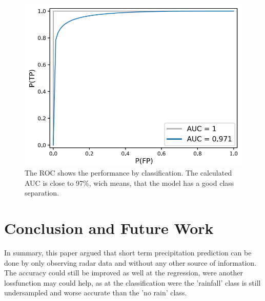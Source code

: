 \documentclass[oneside]{htwg-report}
\begin{document}
\begin{figure}[ht]
\centering
\includegraphics[width=\linewidth]{../pics/roc-curve-RESIZED_TXT}
\caption{The ROC shows the performance by classification. The calculated AUC is close to 97\%, wich means, that the model has a good class separation.}
\label{fig:roc}
\end{figure}

\section*{Conclusion and Future Work}
In summary, this paper argued that short term precipitation prediction can be done by only observing radar data and without any other source of information.
The accuracy could still be improved as well at the regression, were another lossfunction may could help, as at the classification were the 'rainfall' class is still undersampled and worse accurate than the 'no rain' class.
\end{document}
